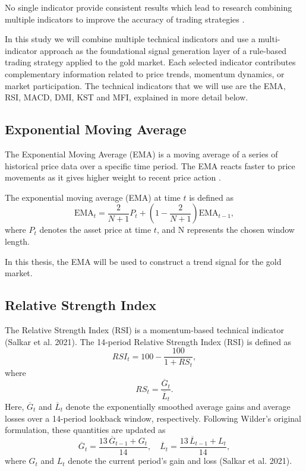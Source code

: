 No single indicator provide consistent results which lead to research combining multiple indicators to improve the accuracy of trading strategies
\citep{saud2024technical}.

In this study we will combine multiple technical indicators and use a multi-indicator approach as the foundational signal
generation layer of a rule-based trading strategy applied to the gold market.
Each selected indicator contributes complementary information related to price
trends, momentum dynamics, or market participation. The technical indicators that we will use are the EMA, RSI, MACD, DMI, KST and MFI, explained in more detail below.



\subsection{Exponential Moving Average}

The Exponential Moving Average (EMA) is a moving average of a series of historical price data over a specific time period. The EMA reacts faster to price movements as it gives higher weight to recent price action \citep{11203332}. 

The exponential moving average (EMA) at time \( t \) is defined as
\[
\mathrm{EMA}_t 
= \frac{2}{N+1} P_t 
+ \left(1 - \frac{2}{N+1}\right)\mathrm{EMA}_{t-1},
\]
where \( P_t \) denotes the asset price at time \( t \), and 
N represents the chosen window length.


In this thesis, the EMA will be used to construct a trend signal for the gold market.

\subsection{Relative Strength Index}

The Relative Strength Index (RSI) is a momentum-based technical indicator
(Salkar et al. 2021). The 14-period Relative Strength Index (RSI) is defined as
\[
RSI_t = 100 - \frac{100}{1 + RS_t},
\]
where
\[
RS_t = \frac{\overline{G}_t}{\overline{L}_t}.
\]
Here, $\overline{G}_t$ and $\overline{L}_t$ denote the exponentially smoothed
average gains and average losses over a 14-period lookback window, respectively.
Following Wilder’s original formulation, these quantities are updated as
\[
\overline{G}_t = \frac{13\,\overline{G}_{t-1} + G_t}{14}, \quad
\overline{L}_t = \frac{13\,\overline{L}_{t-1} + L_t}{14},
\]
where $G_t$ and $L_t$ denote the current period’s gain and loss
(Salkar et al. 2021).


